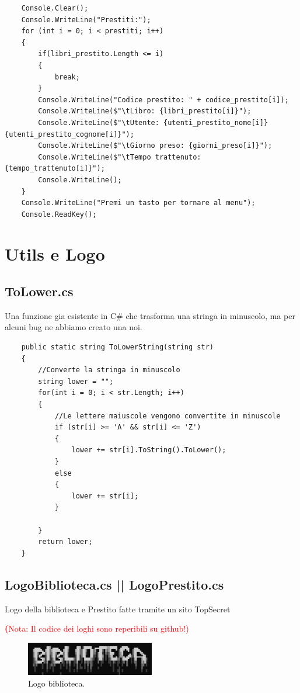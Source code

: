 \documentclass[a4paper,12pt]{article}
\begin{document}
\begin{lstlisting}
    Console.Clear();
    Console.WriteLine("Prestiti:");
    for (int i = 0; i < prestiti; i++)
    {
        if(libri_prestito.Length <= i)
        {
            break;
        }
        Console.WriteLine("Codice prestito: " + codice_prestito[i]);
        Console.WriteLine($"\tLibro: {libri_prestito[i]}");
        Console.WriteLine($"\tUtente: {utenti_prestito_nome[i]} {utenti_prestito_cognome[i]}");
        Console.WriteLine($"\tGiorno preso: {giorni_preso[i]}");
        Console.WriteLine($"\tTempo trattenuto: {tempo_trattenuto[i]}");
        Console.WriteLine();
    }
    Console.WriteLine("Premi un tasto per tornare al menu");
    Console.ReadKey();
\end{lstlisting}

\newpage

\section{Utils e Logo}
\subsection{ToLower.cs}
Una funzione gia esistente in C\# che trasforma una stringa in minuscolo, ma per alcuni bug ne abbiamo creato una noi.
\begin{lstlisting}
    public static string ToLowerString(string str)
    {
        //Converte la stringa in minuscolo
        string lower = "";
        for(int i = 0; i < str.Length; i++)
        {
            //Le lettere maiuscole vengono convertite in minuscole
            if (str[i] >= 'A' && str[i] <= 'Z')
            {
                lower += str[i].ToString().ToLower();
            }
            else
            {
                lower += str[i];
            }
                
        }
        return lower;
    }
\end{lstlisting}

\subsection{LogoBiblioteca.cs || LogoPrestito.cs}
Logo della biblioteca e Prestito fatte tramite un sito TopSecret

\textcolor{red}{\tiny{\textbf(Nota: Il codice dei loghi sono reperibili su github!)}}

\begin{figure}[h!]
    \centering
    \includegraphics[width=0.5\textwidth]{biblioteca.png}
    \caption{Logo biblioteca.}
    \label{fig:etichetta}
\end{figure}
\end{document}

